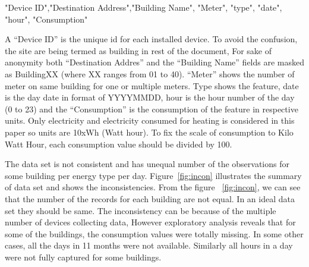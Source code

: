 "Device ID","Destination Address","Building Name", "Meter", "type", "date", "hour", "Consumption"

A ``Device ID'' is the unique id for each installed device. To avoid the confusion, the site are being termed as building in rest of the document, For sake of anonymity both ``Destination Addres'' and the ``Building Name'' fields are masked as BuildingXX (where XX ranges from  01 to 40). ``Meter'' shows the number of meter on same building for one or multiple meters. Type shows the feature, date is the day date in format of YYYYMMDD, hour is the hour number of the day (0 to 23) and the ``Consumption'' is the consumption of the feature in respective units. Only electricity and electricity consumed for heating is considered in this paper so units are 10xWh (Watt hour).
To fix the scale of consumption to Kilo Watt Hour, each consumption value should be divided by 100. 

The data set is not consistent and has unequal number of the observations for some building per energy type per day. Figure~\ref{fig:incon} illustrates the summary of data set and shows the inconsistencies. From the figure ~\ref{fig:incon}, we can see that the number of the records for each building are not equal. In an ideal data set they should be same. The inconsistency can be because of the multiple number of devices collecting data, However exploratory analysis reveals that for some of the buildings, the consumption values were totally missing. In some other cases, all the days in 11 months were not available. Similarly all hours in a day were not fully captured for some buildings.

